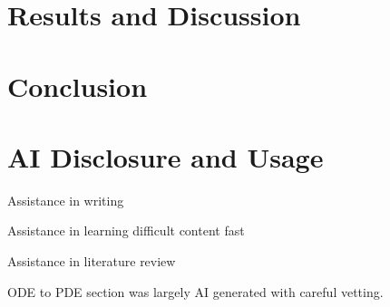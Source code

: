 \documentclass[11pt]{article}
\begin{document}
\section{Results and Discussion}

\section{Conclusion}

\section*{AI Disclosure and Usage}
Assistance in writing

Assistance in learning difficult content fast

Assistance in literature review

ODE to PDE section was largely AI generated with careful 
vetting.

\printbibliography              %
\end{document}
